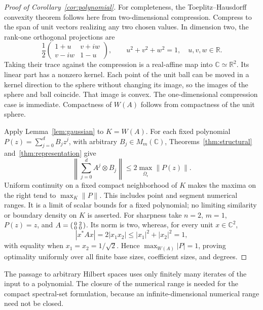 \documentclass[11pt]{article}
\newcommand{\C}{\mathbb C}
\newcommand{\R}{\mathbb R}
\theoremstyle{definition}
\theoremstyle{remark}
\numberwithin{equation}{section}
\begin{document}
\begin{proof}[Proof of Corollary~\ref{cor:polynomial}]
For completeness, the Toeplitz--Hausdorff convexity theorem
\cite{Toeplitz1918,Hausdorff1919} follows here from two-dimensional
compression. Compress to the span of unit vectors realizing any two chosen
values. In dimension two, the rank-one orthogonal projections are
\[
 \frac12\begin{pmatrix}1+u&v+iw\\v-iw&1-u\end{pmatrix},
 \qquad u^2+v^2+w^2=1,\quad u,v,w\in\R.
\]
Taking their trace against the compression is a real-affine map into
$\C\simeq\R^2$. Its linear part has a nonzero kernel. Each point of the
unit ball can be moved in a kernel direction to the sphere without
changing its image, so the images of the sphere and ball coincide.
That image is convex. The one-dimensional compression case is immediate. Compactness
of $W(A)$ follows from compactness of the unit sphere.

Apply Lemma~\ref{lem:gaussian} to $K=W(A)$. For each fixed polynomial
$P(z)=\sum_{j=0}^dB_jz^j$, with arbitrary $B_j\in M_m(\C)$,
Theorems~\ref{thm:structural} and~\ref{thm:representation} give
\[
 \left\|\sum_{j=0}^dA^j\otimes B_j\right\|
 \le2\max_{\overline\Omega_\epsilon}\|P(z)\|.
\]
Uniform continuity on a fixed compact neighborhood of $K$ makes the
maxima on the right tend to $\max_K\|P\|$. This includes point and
segment numerical ranges. It is a limit of scalar bounds for a fixed
polynomial; no limiting similarity or boundary density on $K$ is asserted.
For sharpness take $n=2$, $m=1$, $P(z)=z$, and
$A=\begin{psmallmatrix}0&2\\0&0\end{psmallmatrix}$. Its norm is two,
whereas, for every unit $x\in\C^2$,
\[
 |x^*Ax|=2|x_1x_2|\le |x_1|^2+|x_2|^2=1,
\]
with equality when $x_1=x_2=1/\sqrt2$. Hence
$\max_{W(A)}|P|=1$, proving optimality uniformly over all finite base
sizes, coefficient sizes, and degrees.
\end{proof}

The passage to arbitrary Hilbert spaces uses only finitely many iterates of
the input to a polynomial. The closure of the numerical range is needed for
the compact spectral-set formulation, because an infinite-dimensional
numerical range need not be closed.
\end{document}
